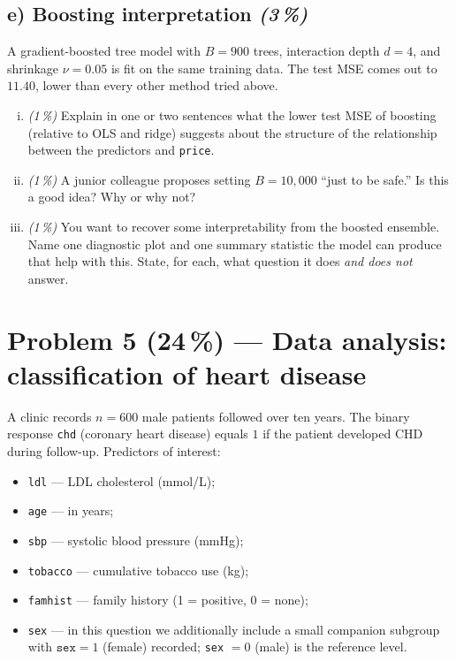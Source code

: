 \documentclass[11pt,a4paper]{article}
\newcommand{\points}[1]{\textbf{(#1\,\%)}}
\newcommand{\subpoints}[1]{\textit{(#1\,\%)}}
\begin{document}
\subsection*{e) Boosting interpretation \subpoints{3}}

A gradient-boosted tree model with $B = 900$ trees, interaction depth $d = 4$, and shrinkage $\nu = 0.05$ is fit on the same training data. The test MSE comes out to $11.40$, lower than every other method tried above.

\begin{enumerate}[(i)]
  \item \subpoints{1} Explain in one or two sentences what the lower test MSE of boosting (relative to OLS and ridge) suggests about the structure of the relationship between the predictors and \texttt{price}.
  \item \subpoints{1} A junior colleague proposes setting $B = 10{,}000$ ``just to be safe.'' Is this a good idea? Why or why not?
  \item \subpoints{1} You want to recover some interpretability from the boosted ensemble. Name one diagnostic plot and one summary statistic the model can produce that help with this. State, for each, what question it does \emph{and does not} answer.
\end{enumerate}

\vfill\eject

\section*{Problem 5 \points{24} --- Data analysis: classification of heart disease}

A clinic records $n = 600$ male patients followed over ten years. The binary response \texttt{chd} (coronary heart disease) equals $1$ if the patient developed CHD during follow-up. Predictors of interest:
\begin{itemize}
  \item \texttt{ldl} --- LDL cholesterol (mmol/L);
  \item \texttt{age} --- in years;
  \item \texttt{sbp} --- systolic blood pressure (mmHg);
  \item \texttt{tobacco} --- cumulative tobacco use (kg);
  \item \texttt{famhist} --- family history (1 = positive, 0 = none);
  \item \texttt{sex} --- in this question we additionally include a small companion subgroup with $\texttt{sex} = 1$ (female) recorded; \texttt{sex} $= 0$ (male) is the reference level.
\end{itemize}
\end{document}
